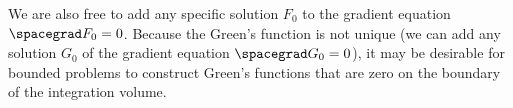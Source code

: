 We are also free to add any specific solution \( F_0 \) to the gradient equation \( \spacegrad F_0 = 0 \).
Because the Green's function is not unique (we can add any solution \( G_0 \) of the gradient equation \( \spacegrad G_0 = 0 \)),
it may be desirable for bounded problems to construct Green's functions that are zero on the boundary of the integration volume.

